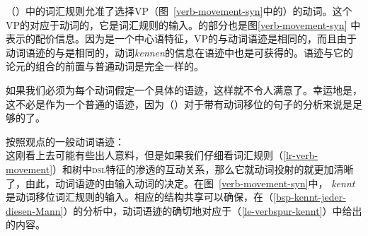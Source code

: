 \noindent
（）中的词汇规则允准了选择VP（图~\ref{verb-movement-syn}中的）的动词。这个VP的\dslv 对应于动词的\locv ，它是词汇规则的输入。\dslv 的部分也是图\ref{verb-movement-syn} 中表示的配价信息。因为\dsl 是一个中心语特征，VP的\dslv 与动词语迹是相同的，而且由于动词语迹的\locv 与\dslv 是相同的，动词\emph{kennen}的\subcat 信息在语迹中也是可获得的。语迹与它的论元的组合的前置与普通动词是完全一样的。

如果我们必须为每个动词假定一个具体的语迹，这样就不令人满意了。幸运地是，这不必是作为一个普通的语迹，因为（）对于带有动词移位的句子的分析来说是足够的了。

\eas
按照观点的一般动词语迹：\\
\label{le-verbspur}
\zs
这刚看上去可能有些出人意料，但是如果我们仔细看词汇规则（\ref{lr-verb-movement}）和树中\textsc{dsl}特征的渗透的互动关系，那么它就动词投射的\dslv 就更加清晰了，由此，动词语迹的\localv 由输入动词的\localv 决定。在图~\ref{verb-movement-syn}中， \emph{kennt}是动词移位词汇规则的输入。相应的结构共享可以确保，在（\ref{bsp-kennt-jeder-diesen-Mann}）的分析中，动词语迹的\localv 确切地对应于（\ref{le-verbspur-kennt}）中给出的内容。

